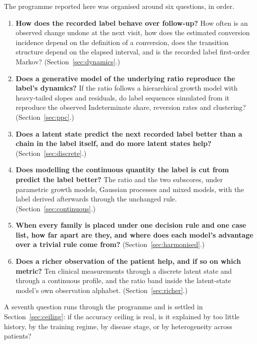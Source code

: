 \documentclass[11pt]{article}
\begin{document}
The programme reported here was organised around six questions, in order.

\begin{enumerate}
\itemsep2pt
\item \textbf{How does the recorded label behave over follow-up?} How often is an
observed change undone at the next visit, how does the estimated conversion
incidence depend on the definition of a conversion, does the transition structure
depend on the elapsed interval, and is the recorded label first-order Markov?
(Section~\ref{sec:dynamics}.)

\item \textbf{Does a generative model of the underlying ratio reproduce the
label's dynamics?} If the ratio follows a hierarchical growth model with
heavy-tailed slopes and residuals, do label sequences simulated from it reproduce
the observed Indeterminate share, reversion rates and clustering?
(Section~\ref{sec:ppc}.)

\item \textbf{Does a latent state predict the next recorded label better than a
chain in the label itself, and do more latent states help?}
(Section~\ref{sec:discrete}.)

\item \textbf{Does modelling the continuous quantity the label is cut from
predict the label better?} The ratio and the two subscores, under parametric
growth models, Gaussian processes and mixed models, with the label derived
afterwards through the unchanged rule. (Section~\ref{sec:continuous}.)

\item \textbf{When every family is placed under one decision rule and one case
list, how far apart are they, and where does each model's advantage over a
trivial rule come from?} (Section~\ref{sec:harmonised}.)

\item \textbf{Does a richer observation of the patient help, and if so on which
metric?} Ten clinical measurements through a discrete latent state and through a
continuous profile, and the ratio band inside the latent-state model's own
observation alphabet. (Section~\ref{sec:richer}.)
\end{enumerate}

A seventh question runs through the programme and is settled in
Section~\ref{sec:ceiling}: if the accuracy ceiling is real, is it explained by too
little history, by the training regime, by disease stage, or by heterogeneity
across patients?
\end{document}
